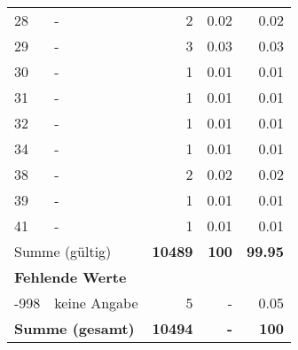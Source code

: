\begin{longtable}{lXrrr}
        28 & \multicolumn{1}{X}{-} & %
          \num{2} &
          \num[round-mode=places,round-precision=2]{0,02} &
          \num[round-mode=places,round-precision=2]{0,02} \\

        29 & \multicolumn{1}{X}{-} & %
          \num{3} &
          \num[round-mode=places,round-precision=2]{0,03} &
          \num[round-mode=places,round-precision=2]{0,03} \\

        30 & \multicolumn{1}{X}{-} & %
          \num{1} &
          \num[round-mode=places,round-precision=2]{0,01} &
          \num[round-mode=places,round-precision=2]{0,01} \\

        31 & \multicolumn{1}{X}{-} & %
          \num{1} &
          \num[round-mode=places,round-precision=2]{0,01} &
          \num[round-mode=places,round-precision=2]{0,01} \\

        32 & \multicolumn{1}{X}{-} & %
          \num{1} &
          \num[round-mode=places,round-precision=2]{0,01} &
          \num[round-mode=places,round-precision=2]{0,01} \\

        34 & \multicolumn{1}{X}{-} & %
          \num{1} &
          \num[round-mode=places,round-precision=2]{0,01} &
          \num[round-mode=places,round-precision=2]{0,01} \\

        38 & \multicolumn{1}{X}{-} & %
          \num{2} &
          \num[round-mode=places,round-precision=2]{0,02} &
          \num[round-mode=places,round-precision=2]{0,02} \\

        39 & \multicolumn{1}{X}{-} & %
          \num{1} &
          \num[round-mode=places,round-precision=2]{0,01} &
          \num[round-mode=places,round-precision=2]{0,01} \\

        41 & \multicolumn{1}{X}{-} & %
          \num{1} &
          \num[round-mode=places,round-precision=2]{0,01} &
          \num[round-mode=places,round-precision=2]{0,01} \\

     \midrule
     \multicolumn{2}{l}{Summe (gültig)} &
       \textbf{\num{10489}} &
     \textbf{100} &
       \textbf{\num[round-mode=places,round-precision=2]{99,95}} \\
     \multicolumn{5}{l}{\textbf{Fehlende Werte}}\\
       -998 &
       keine Angabe &
         \num{5} &
        - &
         \num[round-mode=places,round-precision=2]{0,05} \\
     \midrule
     \multicolumn{2}{l}{\textbf{Summe (gesamt)}} &
          \textbf{\num{10494}} &
        \textbf{-} &
        \textbf{100} \\
     \bottomrule
     \end{longtable}
     
